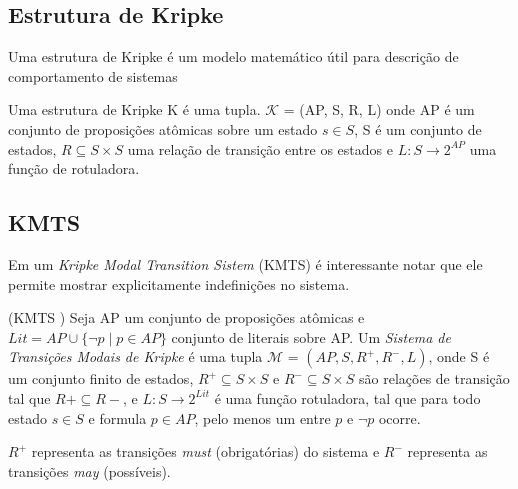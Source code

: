 \subsection{Estrutura de Kripke}
Uma estrutura de Kripke é um modelo matemático útil para descrição de comportamento de sistemas

\theoremstyle{definition}
\begin{definition}
Uma estrutura de Kripke K é uma tupla. $ \mathcal{K} $ = (AP, S, R, L) onde AP é um conjunto de proposições atômicas sobre um estado $\textit{s} \in S$, S é um conjunto de estados, $ R \subseteq S \times S $ uma relação de transição entre os estados e $\textit{L}: \textit{S} \rightarrow 2^{AP}$ uma função de rotuladora.
\end{definition}


\subsection{KMTS}

Em um \textit{Kripke Modal Transition Sistem} (KMTS) é interessante notar que ele permite mostrar explicitamente indefinições no sistema.


\theoremstyle{definition}
\begin{definition}(KMTS \cite{machado2017uso})
Seja AP um conjunto de proposições atômicas e $ Lit = AP \cup \{\neg \textit{p} \; \vert \; \textit{p} \in AP\} $ conjunto de literais sobre AP. Um \textit{Sistema de Transições Modais de Kripke} é uma tupla  $ \mathcal{M} $ = $(AP, S, R^+, R^-, L)$, onde S é um conjunto finito de estados, $ R^+ \subseteq S \times S $ e $ R^- \subseteq S \times S $ são relações de transição tal que $ R+ \subseteq R- $, e $\textit{L}: \textit{S} \rightarrow 2^{Lit}$ é uma função rotuladora, tal que para todo estado $s \in S$ e formula $p \in AP$, pelo menos um entre $\textit{p}$ e $\neg \textit{p}$ ocorre.
\end{definition}

$R^+$ representa as transições \textit{must} (obrigatórias) do sistema e $R^-$ representa as transições \textit{may} (possíveis).


